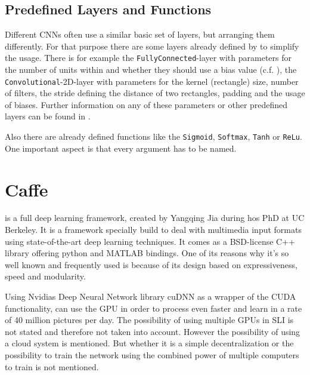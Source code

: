 \subsection{Predefined Layers and Functions} \label{subsec: CNNArchLang - predefines layers}
Different CNNs often use a similar basic set of layers, but arranging them differently. For that purpose there are some layers already defined by \cnnarch to simplify the usage.
There is for example the \texttt{FullyConnected}-layer with parameters for the number of units within and whether they should use a bias value (c.f. ), the \texttt{Convolutional}-2D-layer with parameters for the kernel (rectangle) size, number of filters, the stride defining the distance of two rectangles, padding and the usage of biases. Further information on any of these parameters or other predefined layers can be found in \cite{CNNArch}.

Also there are already defined functions like the \texttt{Sigmoid}, \texttt{Softmax}, \texttt{Tanh} or \texttt{ReLu}. 
One important aspect is that every argument has to be named. 


\section{Caffe} \label{subsec: Caffe}


\caffe is a full deep learning framework, created by Yangqing Jia during hos PhD at UC Berkeley. It is a framework specially build to deal with multimedia input formats using state-of-the-art deep learning techniques. It comes as a BSD-license C++ library offering python and MATLAB bindings. One of its reasons why it's so well known and frequently used is because of its design based on expressiveness, speed and modularity.

Using Nvidias Deep Neural Network library cuDNN as a wrapper of the CUDA functionality, \caffe can use the GPU in order to process even faster and learn in a rate of 40 million pictures per day. The possibility of using multiple GPUs in SLI is not stated and therefore not taken into account. \cite{wiki:Caffe}
However the possibility of using a cloud system is mentioned. But whether it is a simple decentralization or the possibility to train the network using the combined power of multiple computers to train is not mentioned. \cite{jia2014caffe}


